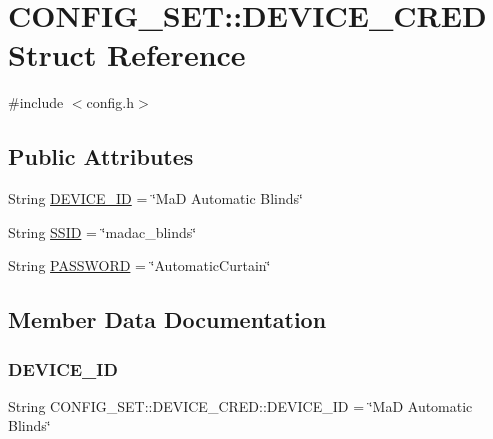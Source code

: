 \hypertarget{structCONFIG__SET_1_1DEVICE__CRED}{}\section{C\+O\+N\+F\+I\+G\+\_\+\+S\+ET\+:\+:D\+E\+V\+I\+C\+E\+\_\+\+C\+R\+ED Struct Reference}
\label{structCONFIG__SET_1_1DEVICE__CRED}


{\ttfamily \#include $<$config.\+h$>$}

\subsection*{Public Attributes}
\begin{DoxyCompactItemize}
\item 
String \hyperlink{structCONFIG__SET_1_1DEVICE__CRED_ab77f14d6b78b3f44a9eaac33adf6626e}{D\+E\+V\+I\+C\+E\+\_\+\+ID} = \char`\"{}MaD Automatic Blinds\char`\"{}
\item 
String \hyperlink{structCONFIG__SET_1_1DEVICE__CRED_a818928833b5cef5089b5d77a749efc88}{S\+S\+ID} = \char`\"{}madac\+\_\+blinds\char`\"{}
\item 
String \hyperlink{structCONFIG__SET_1_1DEVICE__CRED_a35d4fac59ead0b8a5185c1d5fc393518}{P\+A\+S\+S\+W\+O\+RD} = \char`\"{}Automatic\+Curtain\char`\"{}
\end{DoxyCompactItemize}


\subsection{Member Data Documentation}
\mbox{\label{structCONFIG__SET_1_1DEVICE__CRED_ab77f14d6b78b3f44a9eaac33adf6626e}} 
\subsubsection{\texorpdfstring{D\+E\+V\+I\+C\+E\+\_\+\+ID}{DEVICE\_ID}}
{\footnotesize\ttfamily String C\+O\+N\+F\+I\+G\+\_\+\+S\+E\+T\+::\+D\+E\+V\+I\+C\+E\+\_\+\+C\+R\+E\+D\+::\+D\+E\+V\+I\+C\+E\+\_\+\+ID = \char`\"{}MaD Automatic Blinds\char`\"{}}

